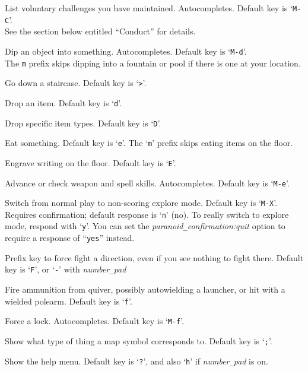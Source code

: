 \item[\tb{\#conduct}]
List voluntary challenges you have maintained. Autocompletes.
Default key is `{\tt M-C}'.\\
See the section below entitled ``Conduct'' for details.
\item[\tb{\#dip}]
Dip an object into something. Autocompletes. Default key is `{\tt M-d}'.\\
The {\tt m} prefix skips dipping into a fountain or pool if there
is one at your location.
\item[\tb{\#down}]
Go down a staircase. Default key is `{\tt >}'.
\item[\tb{\#drop}]
Drop an item. Default key is `{\tt d}'.
\item[\tb{\#droptype}]
Drop specific item types. Default key is `{\tt D}'.
\item[\tb{\#eat}]
Eat something. Default key is `{\tt e}'.
The `{\tt m}' prefix skips eating items on the floor.
\item[\tb{\#engrave}]
Engrave writing on the floor. Default key is `{\tt E}'.
\item[\tb{\#enhance}]
Advance or check weapon and spell skills. Autocompletes.
Default key is `{\tt M-e}'.
\item[\tb{\#exploremode}]
Switch from normal play to non-scoring explore mode.
Default key is `{\tt M-X}'.\\
Requires confirmation; default response is `{\tt n}' (no).
To really switch to explore mode, respond with `{\tt y}'.
You can set the
{\it paranoid\verb+_+confirmation:quit\/}
option to require a response of ``{\tt yes}'' instead.
\item[\tb{\#fight}]
Prefix key to force fight a direction, even if you see nothing
to fight there.
Default key is `{\tt F}', or `{\tt -}' with
{\it number\verb+_+pad\/}
\item[\tb{\#fire}]
Fire ammunition from quiver, possibly autowielding a launcher,
or hit with a wielded polearm.
Default key is `{\tt f}'.
\item[\tb{\#force}]
Force a lock. Autocompletes. Default key is `{\tt M-f}'.
\item[\tb{\#glance}]
Show what type of thing a map symbol corresponds to. Default key is `{\tt ;}'.
\item[\tb{\#help}]
Show the help menu.
Default key is `{\tt ?}',
and also `{\tt h}' if {\it number\verb+_+pad\/} is on.
\item[\tb{\#herecmdmenu}]
